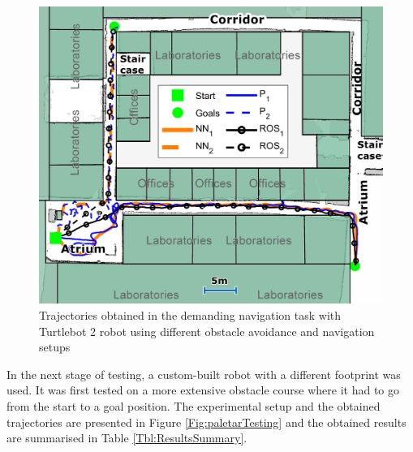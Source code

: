 \begin{figure}
\centering
\includegraphics[width=0.85\columnwidth]{slike/res_hodnik1.jpg}
\caption{Trajectories obtained in the demanding navigation task with Turtlebot 2 robot using different obstacle avoidance and navigation setups}
\label{Fig:Trajektorije_hodnik}
\end{figure}

In the next stage of testing, a custom-built robot with a different footprint was used. It was first tested on a more extensive obstacle course where it had to go from the start to a goal position. The experimental setup and the obtained trajectories are presented in Figure \ref{Fig:paletarTesting} and the obtained results are summarised in Table \ref{Tbl:ResultsSummary}.

